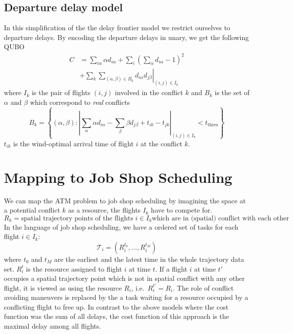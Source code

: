 \documentclass{article}
\begin{document}
\subsection{Departure delay model}
In this simplification of the the delay frontier model we restrict ourselves to departure delays. 
By encoding the departure delays in unary, we get the following QUBO
\begin{align*}
    C &= \sum_{i\alpha} \alpha d_{i\alpha}
       + \sum_i \left( \sum_\alpha d_{i\alpha} - 1 \right)^2 \\
      &+ \sum_k \left. \sum_{(\alpha, \beta) \in B_k} d_{i\alpha} d_{j\beta} \right|_{(i,j)\in I_k}
\end{align*}
where $I_k$ is the pair of flights $(i, j)$ involved in the conflict $k$ and $B_k$ is the set of $\alpha$ and $\beta$ which correspond to \emph{real} conflicts
\begin{equation*}
    B_k = \left\{(\alpha, \beta) : \left| \sum_\alpha \alpha d_{i\alpha} -\sum_\beta \beta d_{j\beta} + t_{ik} - t_{jk} \right|_{(i,j)\in I_k} < t_\text{thres} \right\}
\end{equation*}
$t_{ik}$ is the wind-optimal arrival time of flight $i$ at the conflict $k$.

\section{Mapping to Job Shop Scheduling}
We can map the ATM problem to job shop scheduling by imagining the space at a potential conflict $k$ as a resource, the flights $I_k$ have to compete for.
\begin{equation*}
    R_k = \text{spatial trajectory points of the flights } i \in I_k \text{which are in (spatial) conflict with each other}
\end{equation*}
In the language of job shop scheduling, we have a ordered set of tasks for each flight $i \in I_k$:
\begin{equation*}
    \mathcal{T}_i = \left(R^{t_0}_i, \dots, R^{t_M}_i\right)
\end{equation*}
where $t_0$ and $t_M$ are the earliest and the latest time in the whole trajectory data set.
$R^t_i$ is the resource assigned to flight $i$ at time $t$.
If a flight $i$ at time $t'$ occupies a spatial trajectory point which is not in spatial conflict with any other flight, it is viewed as using the resource $R_i$, i.e.\ $R^{t'}_i = R_i$.
The role of conflict avoiding maneuvers is replaced by the a task waiting for a resource occupied by a conflicting flight to free up.
In contrast to the above models where the cost function was the sum of all delays, the cost function of this approach is the maximal delay among all flights.
\end{document}
